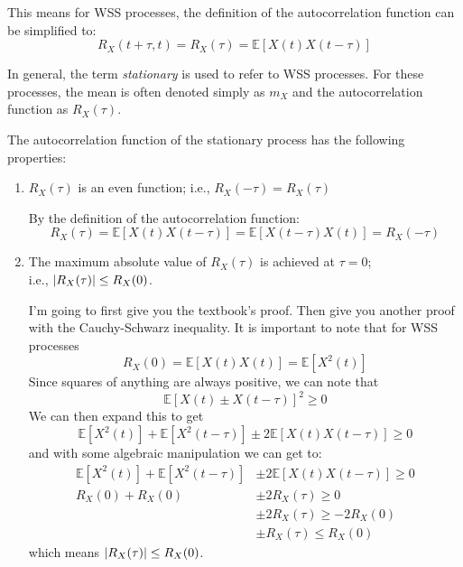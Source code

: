 This means for WSS processes, the definition of the autocorrelation function
can be simplified to:
\[
	R_X(t+\tau,t) = R_X(\tau) = \mathbb{E}[X(t)X(t-\tau)]
\]

In general, the term \textit{stationary} is used to refer to WSS processes.
For these processes, the mean is often denoted simply as \(m_X\) and the
autocorrelation function as \(R_X(\tau)\).

The autocorrelation function of the stationary process has the following properties:
\begin{enumerate}
	\item \(R_X(\tau)\) is an even function; i.e., \(R_X(-\tau)=R_X(\tau)\)
	      \begin{derivation}
		      By the definition of the autocorrelation function:
		      \[
			      R_X(\tau)=\mathbb{E}[X(t)X(t-\tau)]=\mathbb{E}[X(t-\tau)X(t)]=R_X(-\tau)
		      \]
	      \end{derivation}
	\item The maximum absolute value of \(R_X(\tau)\) is achieved at \(\tau=0\);\\
	      i.e., \(\lvert R_X(\tau)\rvert \leq R_X(0)\).
	      \begin{derivation}
		      I'm going to first give you the textbook's proof. Then give you another
		      proof with the Cauchy-Schwarz inequality.
		      It is important to note that for WSS processes
		      \[
			      R_X(0)=\mathbb{E}[X(t)X(t)]=\mathbb{E}[X^2(t)]
		      \]
		      Since squares of anything are always positive, we can note that
		      \[
			      \mathbb{E}[X(t) \pm X(t-\tau)]^2 \geq 0
		      \]
		      We can then expand this to get
		      \[
			      \mathbb{E}[X^2(t)]+\mathbb{E}[X^2(t-\tau)]
			      \pm 2\mathbb{E}[X(t)X(t-\tau)] \geq 0
		      \]
		      and with some algebraic manipulation we can get to:
		      \begin{align*}
			      \mathbb{E}[X^2(t)]+\mathbb{E}[X^2(t-\tau)]
			                      & \pm 2\mathbb{E}[X(t)X(t-\tau)] \geq 0      \\
			      R_X(0) + R_X(0) & \pm 2 R_X(\tau) \geq 0                     \\
			                      & \pm 2R_X(\tau) \geq -2R_X(0)               \\
			                      & \pm R_X(\tau)                  \leq R_X(0)
		      \end{align*}
		      which means \(\lvert R_X(\tau)\rvert \leq R_X(0)\).


\end{derivation}
\end{enumerate}
